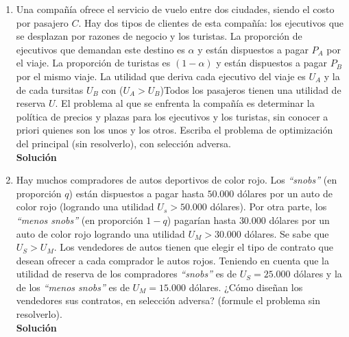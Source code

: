 \documentclass[10pt,a4paper]{article}
\begin{document}
\begin{enumerate}
	\item Una compañía ofrece el servicio de vuelo entre dos ciudades, siendo el costo por pasajero $C$. Hay dos tipos de clientes de esta compañía: los ejecutivos que se desplazan por razones de negocio y los turistas. La proporción de ejecutivos que demandan este destino es $\alpha$ y están dispuestos a pagar $P_A$ por el viaje. La proporción de turistas es $(1-\alpha)$ y están dispuestos a pagar $P_B$ por el mismo viaje. La utilidad que deriva cada ejecutivo del viaje es $U_A$ y la de cada tursitas $U_B$ con ($U_A > U_B$)Todos los pasajeros tienen una utilidad de reserva $U$. El problema al que se enfrenta la compañía es determinar la política de precios y plazas para los ejecutivos y los turistas, sin conocer a priori quienes son los unos y los otros. Escriba el problema de optimización del principal (sin resolverlo), con selección adversa.\\
	
		\textbf{\LARGE Solución}\\
			
	
	\item Hay muchos compradores de autos deportivos de color rojo. Los \emph{``snobs''} (en proporción $q$) están dispuestos a pagar hasta $50.000$ dólares por un auto de color rojo (logrando una utilidad $U_{s} > 50.000$ dólares). Por otra parte, los \emph{``menos snobs''} (en proporción $1-q$) pagarían hasta $30.000$ dólares por un auto de color rojo logrando una utilidad $U_{M}>30.000$ dólares. Se sabe que $U_S > U_{M}$. Los vendedores de autos tienen que elegir el tipo de contrato que desean ofrecer a cada comprador le autos rojos. Teniendo en cuenta que la utilidad de reserva de los compradores \emph{``snobs''} es de $U_{S}=25.000$ dólares y la de los \emph{``menos snobs''} es de $U_{M}=15.000$ dólares. ¿Cómo diseñan los vendedores sus contratos, en selección adversa? (formule el problema sin resolverlo).\\
	
		\textbf{\LARGE Solución}\\
			
	

\end{enumerate}
\end{document}
